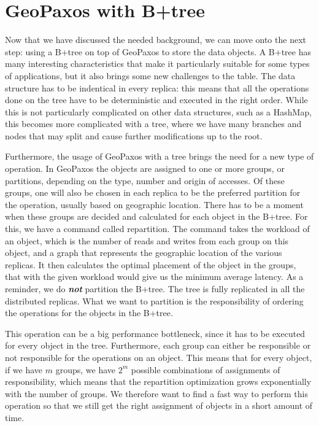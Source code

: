\chapter{GeoPaxos with B+tree}\label{sec:geopaxos-with-B+tree}
Now that we have discussed the needed background, we can move onto the next step: using a B+tree \citep{b+tree} on top of GeoPaxos to store the data objects. A B+tree has many interesting characteristics that make it particularly suitable for some types of applications, but it also brings some new challenges to the table. The data structure has to be indentical in every replica: this means that all the operations done on the tree have to be deterministic and executed in the right order. While this is not particularly complicated on other data structures, such as a HashMap, this becomes more complicated with a tree, where we have many branches and nodes that may split and cause further modifications up to the root.

Furthermore, the usage of GeoPaxos with a tree brings the need for a new type of operation. In GeoPaxos the objects are assigned to one or more groups, or partitions, depending on the type, number and origin of accesses. Of these groups, one will also be chosen in each replica to be the preferred partition for the operation, usually based on geographic location. There has to be a moment when these groups are decided and calculated for each object in the B+tree. For this, we have a command called repartition. The command takes the workload of an object, which is the number of reads and writes from each group on this object, and a graph that represents the geographic location of the various replicas. It then calculates the optimal placement of the object in the groups, that with the given workload would give us the minimum average latency. As a reminder, we do \textbf{\emph{not}} partition the B+tree. The tree is fully replicated in all the distributed replicas. What we want to partition is the responsibility of ordering the operations for the objects in the B+tree.

This operation can be a big performance bottleneck, since it has to be executed for every object in the tree. Furthermore, each group can either be responsible or not responsible for the operations on an object. This means that for every object, if we have $m$ groups, we have $2^m$ possible combinations of assignments of responsibility, which means that the repartition optimization grows exponentially with the number of groups. We therefore want to find a fast way to perform this operation so that we still get the right assignment of objects in a short amount of time.

